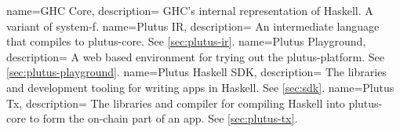{
  name=GHC Core,
  description={
    GHC's internal representation of Haskell.
    A variant of \gls{system-f}.
  }
}
{
  name=Plutus IR,
  description={
    An intermediate language that compiles to \gls{plutus-core}.
    See \cref{sec:plutus-ir}.
  }
}
{
  name=Plutus Playground,
  description={
    A web based environment for trying out the \gls{plutus-platform}.
    See \cref{sec:plutus-playground}.
  }
}
{
  name=Plutus Haskell SDK,
  description={
    The libraries and development tooling for writing \glspl{app} in Haskell.
    See \cref{sec:sdk}.
  }
}
{
  name=Plutus Tx,
  description={
    The libraries and compiler for compiling Haskell into \gls{plutus-core} to form the on-chain part of an \gls{app}.
    See \cref{sec:plutus-tx}.
  }
}

